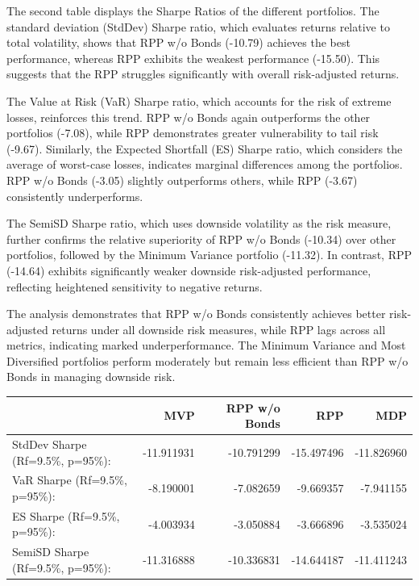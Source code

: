\documentclass[11pt,preprint]{elsarticle}
\let\origtable\table
\let\endorigtable\endtable
\renewenvironment{table}[1][2] {
    \expandafter\origtable\expandafter[H]
} {
    \endorigtable
}
\numberwithin{equation}{section}
\numberwithin{figure}{section}
\numberwithin{table}{section}
\begin{document}
The second table displays the Sharpe Ratios of the different portfolios.
The standard deviation (StdDev) Sharpe ratio, which evaluates returns
relative to total volatility, shows that RPP w/o Bonds (-10.79) achieves
the best performance, whereas RPP exhibits the weakest performance
(-15.50). This suggests that the RPP struggles significantly with
overall risk-adjusted returns.

The Value at Risk (VaR) Sharpe ratio, which accounts for the risk of
extreme losses, reinforces this trend. RPP w/o Bonds again outperforms
the other portfolios (-7.08), while RPP demonstrates greater
vulnerability to tail risk (-9.67). Similarly, the Expected Shortfall
(ES) Sharpe ratio, which considers the average of worst-case losses,
indicates marginal differences among the portfolios. RPP w/o Bonds
(-3.05) slightly outperforms others, while RPP (-3.67) consistently
underperforms.

The SemiSD Sharpe ratio, which uses downside volatility as the risk
measure, further confirms the relative superiority of RPP w/o Bonds
(-10.34) over other portfolios, followed by the Minimum Variance
portfolio (-11.32). In contrast, RPP (-14.64) exhibits significantly
weaker downside risk-adjusted performance, reflecting heightened
sensitivity to negative returns.

The analysis demonstrates that RPP w/o Bonds consistently achieves
better risk-adjusted returns under all downside risk measures, while RPP
lags across all metrics, indicating marked underperformance. The Minimum
Variance and Most Diversified portfolios perform moderately but remain
less efficient than RPP w/o Bonds in managing downside risk.

\begin{table}
\centering
\caption{\label{tab:sharpe-ratios}Sharpe Ratios}
\centering
\begin{tabular}[t]{l|r|r|r|r}
\hline
  & MVP & RPP w/o Bonds & RPP & MDP\\
\hline
StdDev Sharpe (Rf=9.5\%, p=95\%): & -11.911931 & -10.791299 & -15.497496 & -11.826960\\
\hline
VaR Sharpe (Rf=9.5\%, p=95\%): & -8.190001 & -7.082659 & -9.669357 & -7.941155\\
\hline
ES Sharpe (Rf=9.5\%, p=95\%): & -4.003934 & -3.050884 & -3.666896 & -3.535024\\
\hline
SemiSD Sharpe (Rf=9.5\%, p=95\%): & -11.316888 & -10.336831 & -14.644187 & -11.411243\\
\hline
\end{tabular}
\end{table}
\end{document}
